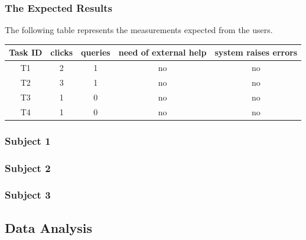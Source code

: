 \documentclass[unicode,9pt,a4paper,oneside,numbers=endperiod,openany]{scrartcl}
\begin{document}
\subsubsection{The Expected Results}

The following table represents the measurements expected from the users.
\newline

\begin{tabular}{c|c|c|c|c}
    Task ID & clicks & queries & need of external help & system raises errors \\ \hline
    T1 & 2 & 1 & no & no \\
    T2 & 3 & 1 & no & no \\
    T3 & 1 & 0 & no & no \\
    T4 & 1 & 0 & no & no \\
\end{tabular}

\subsubsection{Subject 1}

\subsubsection{Subject 2}

\subsubsection{Subject 3}

\subsection{Data Analysis}
\end{document}
